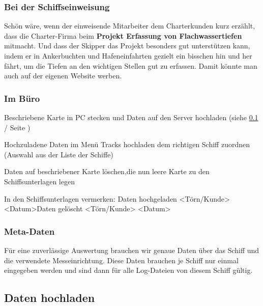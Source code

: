 \documentclass[pdftex, fontsize=8pt, paper=130mm:92mm,pagesize]{scrartcl}
\begin{document}
\subsubsection{Bei der Schiffseinweisung} 

Schön wäre, wenn der einweisende Mitarbeiter dem Charterkunden kurz erzählt, dass die Charter-Firma beim \textbf{Projekt \glqq Erfassung von Flachwassertiefen\grqq{}} mitmacht. Und dass der Skipper das Projekt besonders gut unterstützen kann, indem er in Ankerbuchten und Hafeneinfahrten gezielt ein bisschen hin und her fährt, um die Tiefen an den wichtigen Stellen gut zu erfassen. 
Damit könnte man auch auf der eigenen Website werben. 

\subsubsection{Im Büro}

\begin{compactenum}
\item Beschriebene Karte in PC stecken und Daten auf den Server hochladen \newline(siehe \ref{sec:upload}  / Seite \pageref{sec:upload}) 
\item Hochzuladene Daten im Menü \glqq Tracks hochladen\grqq{} dem richtigen Schiff zuordnen (Auswahl aus der Liste der Schiffe) 
\item Daten auf beschriebener Karte löschen,\newline die nun leere Karte zu den Schiffsunterlagen legen 
\item In den Schiffsunterlagen vermerken: \newline Daten hochgeladen <Törn/Kunde> <Datum>\newline Daten gelöscht <Törn/Kunde> <Datum>
\end{compactenum}


\subsubsection{Meta-Daten}

Für eine zuverlässige Auswertung brauchen wir genaue Daten über das Schiff und die verwendete Messeinrichtung. Diese Daten brauchen je Schiff nur einmal eingegeben werden und sind dann für alle Log-Dateien von diesem Schiff gültig. 


\subsection{Daten hochladen}\label{sec:upload}
\end{document}
